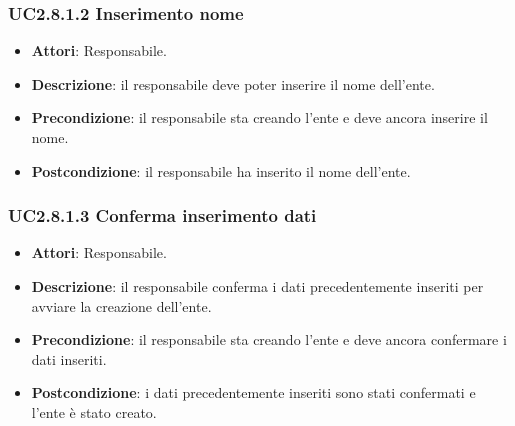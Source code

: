\subsubsection{UC2.8.1.2 Inserimento nome}
\begin{itemize}
\item \textbf{Attori}: Responsabile.
\item \textbf{Descrizione}:  il responsabile deve poter inserire il nome dell'ente.
\item \textbf{Precondizione}: il responsabile sta creando l'ente e deve ancora inserire il nome.
\item \textbf{Postcondizione}: il responsabile ha inserito il nome dell'ente.
\end{itemize}
\subsubsection{UC2.8.1.3 Conferma inserimento dati}
\begin{itemize}
\item \textbf{Attori}: Responsabile.
\item \textbf{Descrizione}: il responsabile conferma i dati precedentemente inseriti per avviare la creazione dell'ente.
\item \textbf{Precondizione}: il responsabile sta creando l'ente e deve ancora confermare i dati inseriti.
\item \textbf{Postcondizione}: i dati precedentemente inseriti sono stati confermati e l'ente è stato creato.
\end{itemize}
